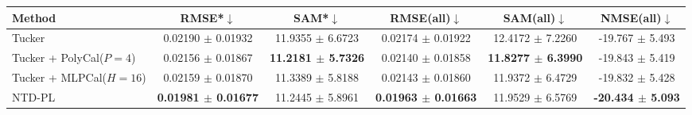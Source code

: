 \begin{tabular}{@{}lccccc@{}}
\toprule
Method & RMSE*$\downarrow$ & SAM*$\downarrow$ & RMSE(all)$\downarrow$ & SAM(all)$\downarrow$ & NMSE(all)$\downarrow$ \\
\midrule
Tucker & 0.02190 $\pm$ 0.01932 & 11.9355 $\pm$ 6.6723 & 0.02174 $\pm$ 0.01922 & 12.4172 $\pm$ 7.2260 & -19.767 $\pm$ 5.493 \\
Tucker + PolyCal($P=4$) & 0.02156 $\pm$ 0.01867 & \textbf{11.2181 $\pm$ 5.7326} & 0.02140 $\pm$ 0.01858 & \textbf{11.8277 $\pm$ 6.3990} & -19.843 $\pm$ 5.419 \\
Tucker + MLPCal($H=16$) & 0.02159 $\pm$ 0.01870 & 11.3389 $\pm$ 5.8188 & 0.02143 $\pm$ 0.01860 & 11.9372 $\pm$ 6.4729 & -19.832 $\pm$ 5.428 \\
NTD-PL & \textbf{0.01981 $\pm$ 0.01677} & 11.2445 $\pm$ 5.8961 & \textbf{0.01963 $\pm$ 0.01663} & 11.9529 $\pm$ 6.5769 & \textbf{-20.434 $\pm$ 5.093} \\
\bottomrule
\end{tabular}
